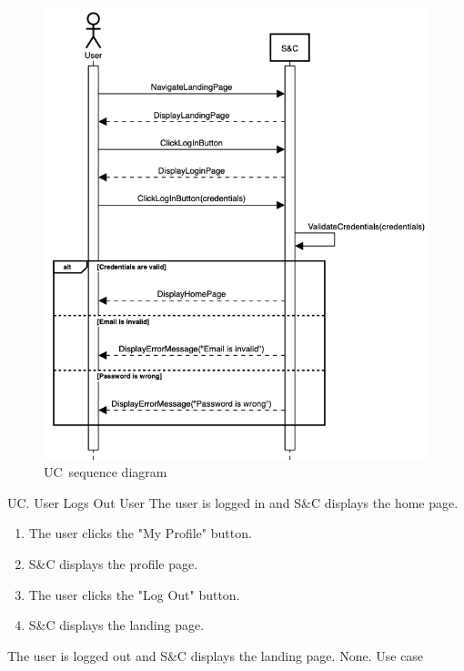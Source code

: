 \begin{figure}
    \centering
    \includegraphics[width=12cm]{images/sequence-diagrams/user-logs-in.png}
    \caption{UC\theuc\ sequence diagram}
\end{figure}


\clearpage
\begin{usecase}
    {UC\theuc. User Logs Out}
    {User}
    {The user is logged in and S\&C displays the home page.}
    {\begin{enumerate}[leftmargin=*]
        \item The user clicks the "My Profile" button.
        \item S\&C displays the profile page.
        \item The user clicks the "Log Out" button.
        \item S\&C displays the landing page.
    \end{enumerate}}
    {The user is logged out and S\&C displays the landing page.}
    {None.}
    {Use case \theuc}
\end{usecase}

